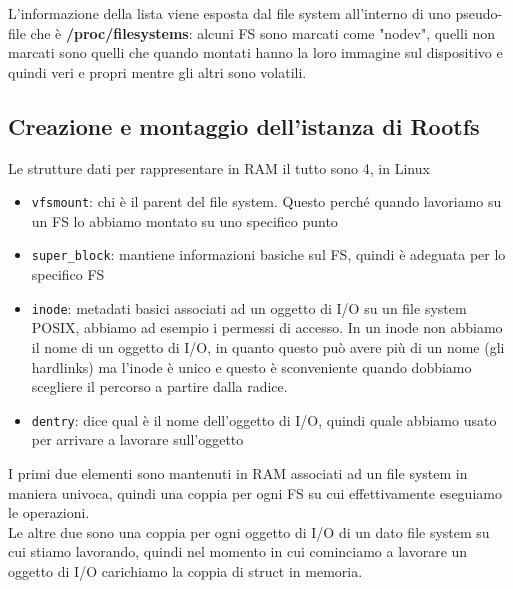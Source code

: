 \documentclass[12pt, oneside]{extbook}
\begin{document}
L'informazione della lista viene esposta dal file system all'interno di uno pseudo-file che è \textbf{/proc/filesystems}: alcuni FS sono marcati come "nodev", quelli non marcati sono quelli che quando montati hanno la loro immagine sul dispositivo e quindi veri e propri mentre gli altri sono volatili.
\subsection{Creazione e montaggio dell'istanza di Rootfs}
Le strutture dati per rappresentare in RAM il tutto sono 4, in Linux
\begin{itemize}
\item \texttt{vfsmount}: chi è il parent del file system. Questo perché quando lavoriamo su un FS lo abbiamo montato su uno specifico punto
\item \texttt{super\_block}: mantiene informazioni basiche sul FS, quindi è adeguata per lo specifico FS
\item \texttt{inode}: metadati basici associati ad un oggetto di I/O su un file system POSIX, abbiamo ad esempio i permessi di accesso. In un inode non abbiamo il nome di un oggetto di I/O, in quanto questo può avere più di un nome (gli hardlinks) ma l'inode è unico e questo è sconveniente quando dobbiamo scegliere il percorso a partire dalla radice.
\item \texttt{dentry}: dice qual è il nome dell'oggetto di I/O, quindi quale abbiamo usato per arrivare a lavorare sull'oggetto
\end{itemize}
I primi due elementi sono mantenuti in RAM associati ad un file system in maniera univoca, quindi una coppia per ogni FS su cui effettivamente eseguiamo le operazioni.\\Le altre due sono una coppia per ogni oggetto di I/O di un dato file system su cui stiamo lavorando, quindi nel momento in cui cominciamo a lavorare un oggetto di I/O carichiamo la coppia di struct in memoria.
\end{document}
